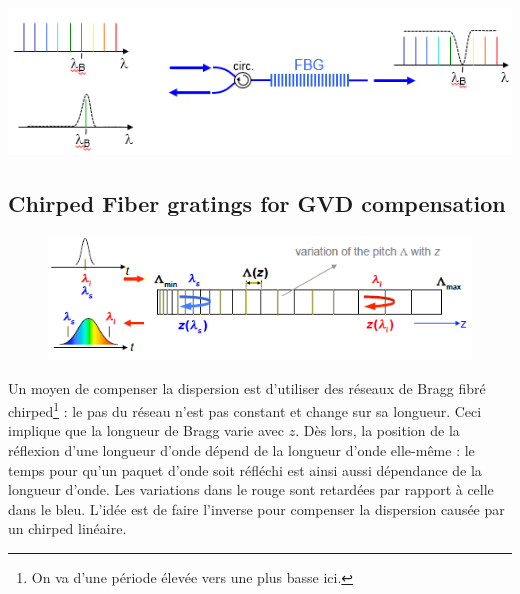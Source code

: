\begin{center}
	\includegraphics[scale=0.8]{ch3/image14}
\end{center}


\subsection{Chirped Fiber gratings for GVD compensation}
	\begin{figure}
	\vspace{-5mm}
	\includegraphics[scale=0.6]{ch3/image15}
	\end{figure}
Un moyen de compenser la dispersion est d'utiliser des réseaux de Bragg fibré chirped\footnote{On 
va d'une période élevée vers une plus basse ici.} : le pas du réseau n'est pas constant et change 
sur sa longueur. Ceci implique que la longueur de Bragg varie avec $z$. Dès lors, la position de
la réflexion d'une longueur d'onde dépend de la longueur d'onde elle-même : le temps pour qu'un
paquet d'onde soit réfléchi est ainsi aussi dépendance de la longueur d'onde. Les variations dans
le rouge sont retardées par rapport à celle dans le bleu. L'idée est de faire l'inverse pour 
compenser la dispersion causée par un chirped linéaire.\\


